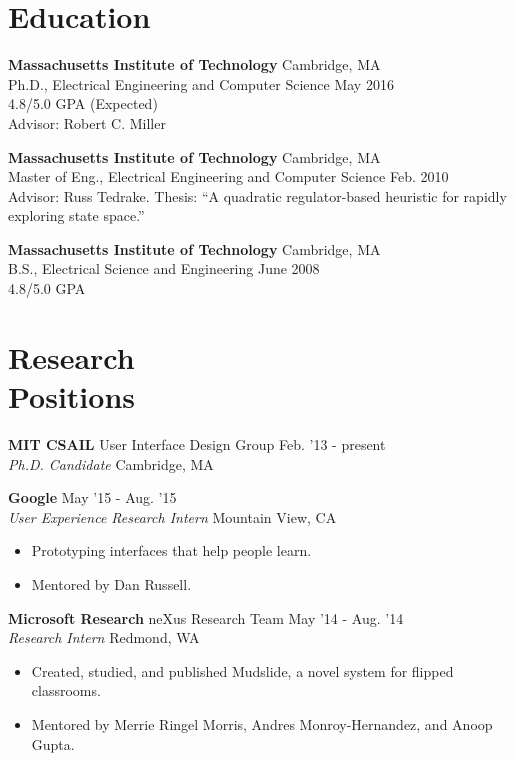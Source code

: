 \documentclass[margin]{res}
\begin{document}
\begin{resume}

\section{Education} 
{\bf Massachusetts Institute of Technology} \hfill Cambridge, MA \\
Ph.D., Electrical Engineering and Computer Science \hfill May 2016\\
4.8/5.0 GPA  \hfill (Expected) \\
Advisor: Robert C. Miller 

{\bf Massachusetts Institute of Technology} \hfill Cambridge, MA \\
Master of Eng., Electrical Engineering and Computer Science \hfill Feb. 2010 \\
Advisor: Russ Tedrake. Thesis: ``A quadratic regulator-based heuristic for rapidly exploring state space.''

{\bf Massachusetts Institute of Technology} \hfill Cambridge, MA \\
B.S., Electrical Science and Engineering \hfill June 2008 \\
4.8/5.0 GPA

\section{Research \\Positions}

{\bf MIT CSAIL} User Interface Design Group \hfill Feb. '13 - present \\ 
{\it Ph.D. Candidate} \hfill Cambridge, MA 

{\bf Google} \hfill May '15 - Aug. '15 \\ {\it User Experience Research Intern} \hfill Mountain View, CA 
 \begin{itemize} \itemsep -2pt  %
 \item Prototyping interfaces that help people learn.
\item Mentored by Dan Russell. 
\end{itemize}

{\bf Microsoft Research} neXus Research Team \hfill May '14 - Aug. '14 \\ {\it Research Intern} \hfill Redmond, WA 
 \begin{itemize} \itemsep -2pt  %
 \item Created, studied, and published Mudslide, a novel system for flipped classrooms.
\item Mentored by Merrie Ringel Morris, Andres Monroy-Hernandez, and Anoop Gupta. 
\end{itemize}


\end{resume}
\end{document}
